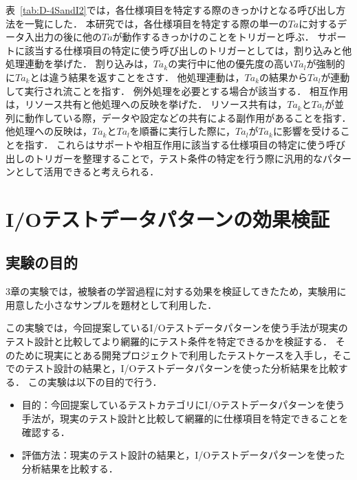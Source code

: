 表~\ref{tab:D-4SandI2}では，各仕様項目を特定する際のきっかけとなる呼び出し方法を一覧にした．
本研究では，各仕様項目を特定する際の単一の$Ta$に対するデータ入出力の後に他の$Ta$が動作するきっかけのことをトリガーと呼ぶ．
サポートに該当する仕様項目の特定に使う呼び出しのトリガーとしては，割り込みと他処理連動を挙げた．
割り込みは，$Ta_k$の実行中に他の優先度の高い$Ta_l$が強制的に$Ta_k$とは違う結果を返すことをさす．
他処理連動は，$Ta_k$の結果から$Ta_l$が連動して実行され流ことを指す．
例外処理を必要とする場合が該当する．
相互作用は，リソース共有と他処理への反映を挙げた．
リソース共有は，$Ta_k$と$Ta_l$が並列に動作している際，データや設定などの共有による副作用があることを指す．
他処理への反映は，$Ta_k$と$Ta_l$を順番に実行した際に，$Ta_l$が$Ta_k$に影響を受けることを指す．
これらはサポートや相互作用に該当する仕様項目の特定に使う呼び出しのトリガーを整理することで，テスト条件の特定を行う際に汎用的なパターンとして活用できると考えられる．

\newpage
\section{I/Oテストデータパターンの効果検証} \label{sec:4-2}
\subsection{実験の目的} \label{sec:4-2-1}

3章の実験では，被験者の学習過程に対する効果を検証してきたため，実験用に用意した小さなサンプルを題材として利用した．

この実験では，今回提案しているI/Oテストデータパターンを使う手法が現実のテスト設計と比較してより網羅的にテスト条件を特定できるかを検証する\cite{yumoto2015ICST}．
そのために現実にとある開発プロジェクトで利用したテストケースを入手し，そこでのテスト設計の結果と，I/Oテストデータパターンを使った分析結果を比較する．
この実験は以下の目的で行う．

\begin{itemize}
\item 目的：今回提案しているテストカテゴリにI/Oテストデータパターンを使う手法が，現実のテスト設計と比較して網羅的に仕様項目を特定できることを確認する．
\item 評価方法：現実のテスト設計の結果と，I/Oテストデータパターンを使った分析結果を比較する．
\end{itemize}

